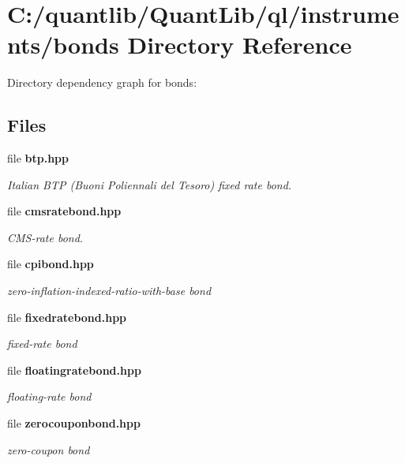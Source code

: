 \section{C\+:/quantlib/\+Quant\+Lib/ql/instruments/bonds Directory Reference}
\label{dir_5db9a3f36f73ca00d1e7f62d1975a70f}
Directory dependency graph for bonds\+:
\subsection*{Files}
\begin{DoxyCompactItemize}
\item 
file {\bf btp.\+hpp}
\begin{DoxyCompactList}\small\item\em Italian B\+TP (Buoni Poliennali del Tesoro) fixed rate bond. \end{DoxyCompactList}\item 
file {\bf cmsratebond.\+hpp}
\begin{DoxyCompactList}\small\item\em C\+M\+S-\/rate bond. \end{DoxyCompactList}\item 
file {\bf cpibond.\+hpp}
\begin{DoxyCompactList}\small\item\em zero-\/inflation-\/indexed-\/ratio-\/with-\/base bond \end{DoxyCompactList}\item 
file {\bf fixedratebond.\+hpp}
\begin{DoxyCompactList}\small\item\em fixed-\/rate bond \end{DoxyCompactList}\item 
file {\bf floatingratebond.\+hpp}
\begin{DoxyCompactList}\small\item\em floating-\/rate bond \end{DoxyCompactList}\item 
file {\bf zerocouponbond.\+hpp}
\begin{DoxyCompactList}\small\item\em zero-\/coupon bond \end{DoxyCompactList}\end{DoxyCompactItemize}
